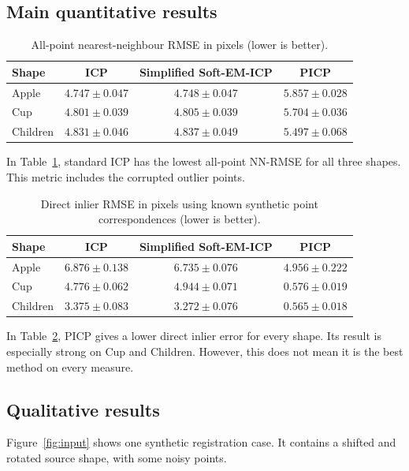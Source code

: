 \documentclass[11pt,a4paper]{article}
\begin{document}
\subsection{Main quantitative results}
\begin{table}[H]
\centering
\caption{All-point nearest-neighbour RMSE in pixels (lower is better).}
\label{tab:allrmse}
\small
\begin{tabular}{lccc}
\toprule
Shape & ICP & Simplified Soft-EM-ICP & PICP \\
\midrule
Apple & $4.747\pm0.047$ & $4.748\pm0.047$ & $5.857\pm0.028$ \\
Cup & $4.801\pm0.039$ & $4.805\pm0.039$ & $5.704\pm0.036$ \\
Children & $4.831\pm0.046$ & $4.837\pm0.049$ & $5.497\pm0.068$ \\
\bottomrule
\end{tabular}
\end{table}

In Table~\ref{tab:allrmse}, standard ICP has the lowest all-point NN-RMSE
for all three shapes. This metric includes the corrupted outlier points.

\begin{table}[H]
\centering
\caption{Direct inlier RMSE in pixels using known synthetic point correspondences (lower is better).}
\label{tab:directrmse}
\small
\begin{tabular}{lccc}
\toprule
Shape & ICP & Simplified Soft-EM-ICP & PICP \\
\midrule
Apple & $6.876\pm0.138$ & $6.735\pm0.076$ & $4.956\pm0.222$ \\
Cup & $4.776\pm0.062$ & $4.944\pm0.071$ & $0.576\pm0.019$ \\
Children & $3.375\pm0.083$ & $3.272\pm0.076$ & $0.565\pm0.018$ \\
\bottomrule
\end{tabular}
\end{table}

In Table~\ref{tab:directrmse}, PICP gives a lower direct inlier error for
every shape. Its result is especially strong on Cup and Children. However,
this does not mean it is the best method on every measure.

\subsection{Qualitative results}
Figure~\ref{fig:input} shows one synthetic registration case. It contains
a shifted and rotated source shape, with some noisy points.
\end{document}
